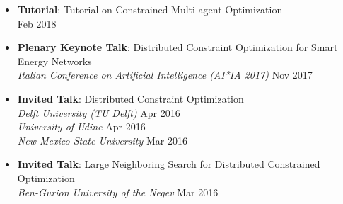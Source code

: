 \begin{itemize}
	\item {\bf Tutorial}: {Tutorial on Constrained Multi-agent Optimization}\\
  	\hfill {Feb 2018}

	\item {\bf Plenary Keynote Talk}: 
	Distributed Constraint Optimization for Smart Energy Networks\\
    {\em Italian Conference on Artificial Intelligence (AI*IA 2017)}
	\hfill {Nov 2017}

	\item {\bf Invited Talk}: Distributed Constraint Optimization\\
	{\em Delft University (TU Delft)} \hfill {Apr 2016}\\
 	{\em University of Udine} \hfill {Apr 2016} \\ 
	{\em New Mexico State University} \hfill {Mar 2016}
	
	\item {\bf Invited Talk}: Large Neighboring Search for Distributed Constrained Optimization\\
	{\em Ben-Gurion University of the Negev} \hfill {Mar 2016}
\end{itemize}
